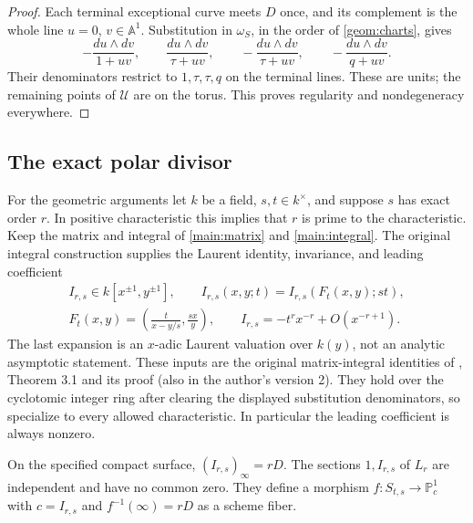 \begin{proof}
Each terminal exceptional curve meets $D$ once, and its complement
is the whole line $u=0$, $v\in\mathbb A^1$.  Substitution in
$\omega_S$, in the order of \eqref{geom:charts}, gives
\[
-\frac{du\wedge dv}{1+uv},\qquad
\frac{du\wedge dv}{\tau+uv},\qquad
-\frac{du\wedge dv}{\tau+uv},\qquad
-\frac{du\wedge dv}{q+uv}.
\]
Their denominators restrict to $1,\tau,\tau,q$ on the terminal
lines.  These are units; the remaining points of $\mathcal U$ are
on the torus.  This proves regularity and nondegeneracy everywhere.
\end{proof}

\subsection{The exact polar divisor}

For the geometric arguments let $k$ be a field, $s,t\in k^\times$,
and suppose $s$ has exact order $r$.  In positive characteristic this
implies that $r$ is prime to the characteristic.  Keep the matrix and
integral of \eqref{main:matrix} and \eqref{main:integral}.  The original
integral construction supplies the Laurent identity, invariance, and
leading coefficient
\begin{equation}
\begin{gathered}
I_{r,s}\in k[x^{\pm1},y^{\pm1}],\qquad
I_{r,s}(x,y;t)=I_{r,s}(F_t(x,y);st),\\
F_t(x,y)=\left(\frac{t}{x-y/s},\frac{sx}{y}\right),\qquad
I_{r,s}=-t^rx^{-r}+O(x^{-r+1}).
\end{gathered}
\label{geom:laurent-input}
\end{equation}
The last expansion is an $x$-adic Laurent valuation over $k(y)$, not
an analytic asymptotic statement.  These inputs are the original
matrix-integral identities of \cite{JoshiRoffelsen2026}, Theorem 3.1
and its proof (also in the author's version 2).  They hold over the
cyclotomic integer ring after clearing the displayed substitution
denominators, so specialize to every allowed characteristic.  In
particular the leading coefficient is always nonzero.

\begin{lemma}\label{geom:poles}
On the specified compact surface, $(I_{r,s})_\infty=rD$.
The sections $1,I_{r,s}$ of $L_r$ are independent and have no common
zero.  They define a morphism $f:S_{t,s}\to\mathbb P^1_c$ with
$c=I_{r,s}$ and $f^{-1}(\infty)=rD$ as a scheme fiber.
\end{lemma}


